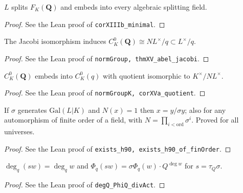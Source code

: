 \begin{corollary}
\label{cor:XIIIb}
\leanok
$L$ splits $F_K(\mathbf Q)$ and embeds into every algebraic splitting field.
\end{corollary}
\begin{proof}
\leanok
See the Lean proof of \texttt{corXIIIb\_minimal}.
\end{proof}

\begin{theorem}
\label{thm:XV}
\leanok
The Jacobi isomorphism induces $C^0_K(\mathbf Q)\cong NL^\times/q\subset L^\times/q$.
\end{theorem}
\begin{proof}
\leanok
See the Lean proof of \texttt{normGroup, thmXV\_abel\_jacobi}.
\end{proof}

\begin{corollary}
\label{cor:XVa}
\leanok
$C^0_K(\mathbf Q)$ embeds into $C^0_K(q)$ with quotient isomorphic to $K^\times/NL^\times$.
\end{corollary}
\begin{proof}
\leanok
See the Lean proof of \texttt{normGroupK, corXVa\_quotient}.
\end{proof}

\begin{lemma}
\label{lem:s5-h90}
\leanok
If $\sigma$ generates $\mathrm{Gal}(L|K)$ and $N(x)=1$ then $x=y/\sigma y$; also for any automorphism of finite order of a field, with $N=\prod_{i<\mathrm{ord}}\sigma^i$. Proved for all universes.
\end{lemma}
\begin{proof}
\leanok
See the Lean proof of \texttt{exists\_h90, exists\_h90\_of\_finOrder}.
\end{proof}

\begin{lemma}[Formula (65)]
\label{lem:s5-formula65}
\leanok
$\deg_q(sw)=\deg_q w$ and $\Phi_q(sw)=\sigma\Phi_q(w)\cdot Q^{\deg w}$ for $s=\tau_Q\sigma$.
\end{lemma}
\begin{proof}
\leanok
See the Lean proof of \texttt{degQ\_PhiQ\_divAct}.
\end{proof}

